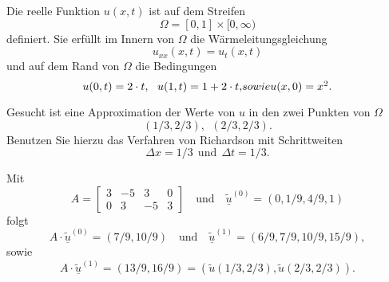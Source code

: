 Die reelle Funktion $u(x,t)$ ist auf dem Streifen
\[
\Omega = [0, 1] \times [0,\infty)
\]
definiert.
Sie erfüllt im Innern von $\Omega$ die Wärmeleitungsgleichung
\[
u_{xx}(x,t) = u_{t}(x,t)
\]
und auf dem Rand von $\Omega$ die Bedingungen
\[
u(0,t) = 2 \cdot t, \ \ u(1,t) = 1 + 2 \cdot t,$$ sowie $$u(x,0) = x^2.
\]

Gesucht ist eine Approximation der Werte von $u$ in den zwei Punkten von
$\Omega$
\[
(1/3,2/3), \ \  (2/3,2/3).
\]
Benutzen Sie hierzu das Verfahren von Richardson mit Schrittweiten
\[
\Delta x = 1/3 \ \ \mbox{und} \ \  \Delta t = 1/3.
\]

\begin{loesung}
Mit
\[
A = \left[\begin{array}{rrrr} 
3 & -5 & 3 & 0 \\
0 & 3 & -5 & 3 \end{array}\right]
\quad
\text{und}\quad
\underline{\tilde u}^{(0)} = (0, 1/9, 4/9, 1)
\]
folgt
\[
A \cdot \underline{\tilde u}^{(0)} = (7/9, 10/9)
\quad\mbox{und}\quad
\underline{\tilde u}^{(1)} = (6/9, 7/9, 10/9, 15/9),
\]
sowie
\[
A \cdot \underline{\tilde u}^{(1)} = (13/9, 16/9) = (\tilde u(1/3,2/3), \tilde u(2/3,2/3)).
\]
\end{loesung}




